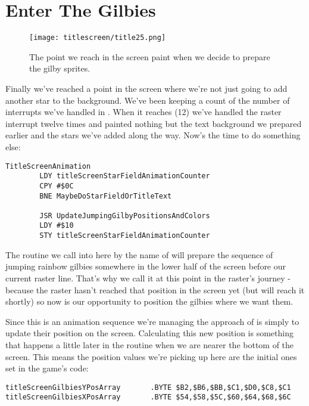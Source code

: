 \section{Enter The Gilbies}
\begin{figure}[H]
    \centering
      \texttt{[image: titlescreen/title25.png]}%
\caption{The point we reach in the screen paint when we decide to prepare the gilby sprites.}
\end{figure}

Finally we've reached a point in the screen where we're not just going to add another star to the background.
We've been keeping a count of the number of interrupts we've handled in .
When it reaches  (12) we've handled the raster interrupt twelve times and painted nothing but the
text background we prepared earlier and the stars we've added along the way. Now's the time to do something else:

\begin{lstlisting}
TitleScreenAnimation
        LDY titleScreenStarFieldAnimationCounter
        CPY #$0C
        BNE MaybeDoStarFieldOrTitleText

        JSR UpdateJumpingGilbyPositionsAndColors
        LDY #$10
        STY titleScreenStarFieldAnimationCounter
\end{lstlisting}

The routine we call into here by the name of  will prepare the sequence
of jumping rainbow gilbies somewhere in the lower half of the screen before our current raster line. That's why we
call it at this point in the raster's journey - because the raster hasn't reached that position in the screen yet
(but will reach it shortly) so now is our opportunity to position the gilbies where we want them. 

Since this is an animation sequence we're managing the approach of  is
simply to update their position on the screen. Calculating this new position is something that happens a little later
in the routine  when we are nearer the bottom of the screen. This means the
position values we're picking up here are the initial ones set in the game's code:

\begin{lstlisting}
titleScreenGilbiesYPosArray       .BYTE $B2,$B6,$BB,$C1,$D0,$C8,$C1
titleScreenGilbiesXPosArray       .BYTE $54,$58,$5C,$60,$64,$68,$6C
\end{lstlisting}

